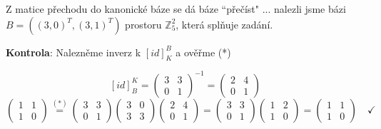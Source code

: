 \documentclass[12pt]{article}
\begin{document}
\begin{enumerate}
    Z matice přechodu do kanonické báze se dá báze ``přečíst" ... nalezli jsme bázi \underline{\underline{$B=\left((3,0)^T,(3,1)^T\right)$}} prostoru $\mathbb{Z}^2_5$, která splňuje zadání.

    \bigskip

    \footnotesize
    \textbf{Kontrola}: Nalezněme inverz k $[id]^B_K$ a ověřme (*)

    \[
      [id]^K_B = \left(\begin{array}{cc}
        3&3 \\ 0&1
      \end{array}\right)^{-1} = \left(\begin{array}{cc}
        2&4 \\ 0&1
      \end{array}\right)
    \]
    \[
      \left(\begin{array}{cc}
        1&1 \\ 1&0
      \end{array}\right) \overset{(*)}{=} \left(\begin{array}{cc}
        3&3 \\ 0&1
      \end{array}\right) \left(\begin{array}{cc}
        3&0 \\ 3&3
      \end{array}\right) \left(\begin{array}{cc}
        2&4 \\ 0&1
      \end{array}\right) =
      \left(\begin{array}{cc}
        3&3 \\ 0&1
      \end{array}\right) \left(\begin{array}{cc}
        1&2 \\ 1&0
      \end{array}\right) = \left(\begin{array}{cc}
        1&1 \\ 1&0
      \end{array}\right) \quad \checkmark
    \]

    

\end{enumerate}
\end{document}
